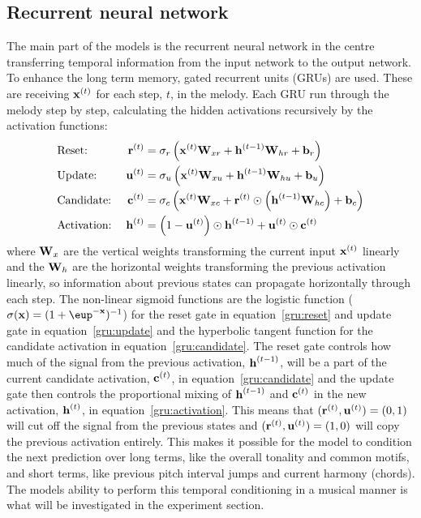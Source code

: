 \subsection{Recurrent neural network} %
\label{sub:recurrent_neural_network}
	The main part of the models is the recurrent neural network in the centre transferring temporal information from the input network to the output network.
	To enhance the long term memory, gated recurrent units (GRUs) are used. These are receiving $\bm{\mathrm{x}}^{(t)}$ for each step, $t$, in the melody. Each GRU run through the melody step by step, calculating the hidden activations recursively by the activation functions:
	\begin{alignat}{2}
	 	& \text{Reset:} \; & \bm{\mathrm{r}}^{(t)} &= \sigma_r\left(\bm{\mathrm{x}}^{(t)} \bm{\mathrm{W}}_{xr} + \bm{\mathrm{h}}^{(t-1)} \bm{\mathrm{W}}_{hr} + \bm{\mathrm{b}}_r\right) \label{gru:reset} \\
        & \text{Update:} \; & \bm{\mathrm{u}}^{(t)} &= \sigma_u\left(\bm{\mathrm{x}}^{(t)} \bm{\mathrm{W}}_{xu} + \bm{\mathrm{h}}^{(t-1)} \bm{\mathrm{W}}_{hu} + \bm{\mathrm{b}}_u\right) \label{gru:update} \\
        & \text{Candidate:} \; & \bm{\mathrm{c}}^{(t)} &= \sigma_c\left(\bm{\mathrm{x}}^{(t)} \bm{\mathrm{W}}_{xc} + \bm{\mathrm{r}}^{(t)} \odot \left(\bm{\mathrm{h}}^{(t-1)} \bm{\mathrm{W}}_{hc}\right) + \bm{\mathrm{b}}_c\right) \label{gru:candidate} \\
        & \text{Activation:} \; & \bm{\mathrm{h}}^{(t)} &= \left(1 - \bm{\mathrm{u}}^{(t)}\right) \odot \bm{\mathrm{h}}^{(t-1)} + \bm{\mathrm{u}}^{(t)} \odot \bm{\mathrm{c}}^{(t)} \label{gru:activation}
	\end{alignat}
	where $\bm{\mathrm{W}}_x$ are the vertical weights transforming the current input $\bm{\mathrm{x}}^{(t)}$ linearly and the $\bm{\mathrm{W}}_h$ are the horizontal weights transforming the previous activation linearly, so information about previous states can propagate horizontally through each step. The non-linear sigmoid functions are the logistic function ($\sigma(\vec{x})=(1+\eup^{-\vec{x}})^{-1}$) for the reset gate in equation~\eqref{gru:reset} and update gate in equation~\eqref{gru:update} and the hyperbolic tangent function for the candidate activation in equation~\eqref{gru:candidate}. The reset gate controls how much of the signal from the previous activation, $\bm{\mathrm{h}}^{(t-1)}$, will be a part of the current candidate activation, $\bm{\mathrm{c}}^{(t)}$, in equation~\eqref{gru:candidate} and the update gate then controls the proportional mixing of $\bm{\mathrm{h}}^{(t-1)}$ and $\bm{\mathrm{c}}^{(t)}$ in the new activation, $\bm{\mathrm{h}}^{(t)}$, in equation~\eqref{gru:activation}. This means that $(\bm{\mathrm{r}}^{(t)}, \bm{\mathrm{u}}^{(t)}) = (0,1)$ will cut off the signal from the previous states and $(\bm{\mathrm{r}}^{(t)}, \bm{\mathrm{u}}^{(t)}) = (1,0)$ will copy the previous activation entirely. This makes it possible for the model to condition the next prediction over long terms, like the overall tonality and common motifs, and short terms, like previous pitch interval jumps and current harmony (chords). The models ability to perform this temporal conditioning in a musical manner is what will be investigated in the experiment section. 

